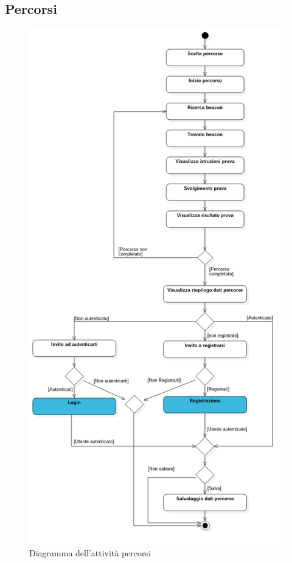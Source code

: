 \subsection{Percorsi}

\begin{figure}[!h]
	\centering
	\includegraphics[scale=0.4]{img/attivita/percorsi}  
	\caption{Diagramma dell'attività percorsi}
\end{figure}

